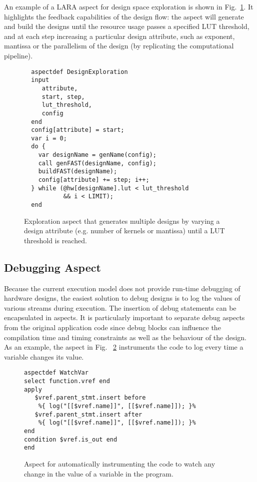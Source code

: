 An example of a LARA aspect for design space exploration is
shown in Fig.~\ref{fig:aspect-exploration}. It highlights the feedback capabilities of the design
flow: the aspect will generate and build the \MAXC{} designs until the
resource usage passes a specified LUT threshold, and at each step
increasing a particular design attribute, such as exponent, mantissa or the parallelism of the design (by replicating the computational pipeline).
\vspace{-3mm}
\lstset{style=lara}
\begin{figure}[!h]
\begin{lstlisting}
  aspectdef DesignExploration
  input
     attribute,
     start, step,
     lut_threshold,
     config
  end
  config[attribute] = start;
  var i = 0;
  do {
    var designName = genName(config);
    call genFAST(designName, config);
    buildFAST(designName);
    config[attribute] += step; i++;
  } while (@hw[designName].lut < lut_threshold
           && i < LIMIT);
  end
\end{lstlisting}
\caption{Exploration aspect that generates multiple \MAXC{} designs by varying a design attribute (e.g. number of kernels or mantissa) until a LUT threshold is reached.}
\label{fig:aspect-exploration}
\vspace{-3mm}
\end{figure}


\subsection{Debugging Aspect}
\label{sect:asp_debug}
Because the current execution model does not provide run-time debugging
of hardware designs, the easiest solution to debug designs is to log
the values of various streams during execution. The insertion of debug
statements can be encapsulated in aspects. It is particularly
important to separate debug aspects from the original application code
since debug blocks can influence the compilation time and timing
constraints as well as the behaviour of the design. As an example,
the aspect in Fig. ~\ref{fig:aspect-debug} instruments the code to log every time a variable changes its value.
\vspace{-3mm}
\lstset{style=lara}
\begin{figure}[!h]
  \centering
\begin{lstlisting}
aspectdef WatchVar
select function.vref end
apply
   $vref.parent_stmt.insert before
    %{ log("[[$vref.name]]", [[$vref.name]]); }%
   $vref.parent_stmt.insert after
    %{ log("[[$vref.name]]", [[$vref.name]]); }%
end
condition $vref.is_out end
end
\end{lstlisting}
  \caption{Aspect for automatically instrumenting the code to watch any change in the value of a  variable in the program.}
  \label{fig:aspect-debug}
\vspace{-3mm}
\end{figure}
